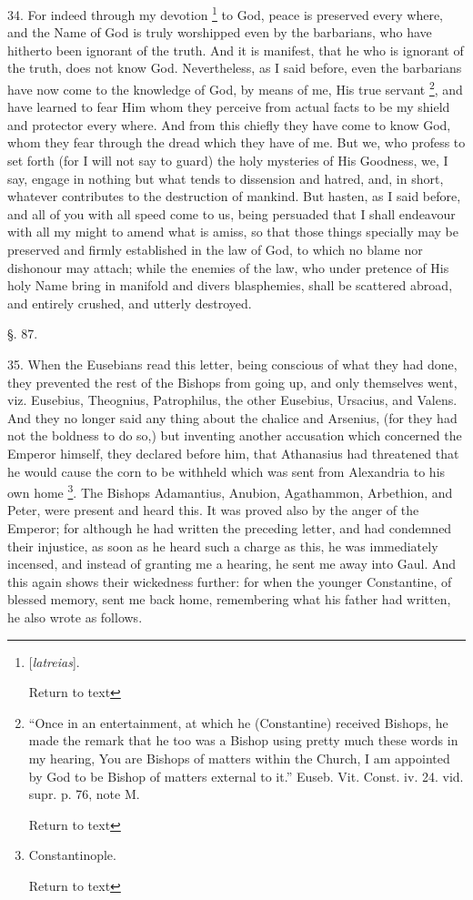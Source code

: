 34. For indeed through my devotion \footnote{[\emph{latreias}].

Return to text} to God, peace is preserved every where, and the Name of God is
truly worshipped even by the barbarians, who have hitherto been
ignorant of the truth. And it is manifest, that he who is ignorant of
the truth, does not know God. Nevertheless, as I said before, even the
barbarians have now come to the knowledge of God, by means of me, His
true servant \footnote{``Once in an entertainment, at which he (Constantine) received Bishops,
he made the remark that he too was a Bishop using pretty much these
words in my hearing, You are Bishops of matters within the Church, I
am appointed by God to be Bishop of matters external to it.'' Euseb.
Vit. Const. iv. 24. vid. supr. p. 76, note M.

Return to text}, and have
learned to fear Him whom they perceive from actual facts to be my
shield and protector every where. And from this chiefly they have come
to know God, whom they fear through the dread which they have of me.
But we, who profess to set forth (for I will not say to guard) the
holy mysteries of His Goodness, we, I say, engage in nothing but what
tends to dissension and hatred, and, in short, whatever contributes to
the destruction of mankind. But hasten, as I said before, and all of
you with all speed come to us, being persuaded that I shall endeavour
with all my might to amend what is amiss, so that those things
specially may be preserved and firmly established in the law of God,
to which no blame nor dishonour may attach; while the enemies of the
law, who under pretence of His holy Name bring in manifold and divers
blasphemies, shall be scattered abroad, and entirely crushed, and
utterly destroyed.

§. 87.

35. When the Eusebians read this letter, being
conscious of what they had done, they prevented the rest of the
Bishops from going up, and only themselves went, viz. Eusebius,
Theognius, Patrophilus, the other Eusebius, Ursacius, and Valens. And
they no longer said any thing about the chalice and Arsenius, (for
they had not the boldness to do so,) but inventing another accusation
which concerned the Emperor himself, they declared before him, that
Athanasius had threatened that he would cause the corn to be withheld
which was sent from Alexandria to his own home \footnote{Constantinople.

Return to text}. The Bishops Adamantius, Anubion, Agathammon, Arbethion, and
Peter, were present and heard this. It was proved also by the anger of
the Emperor; for although he had written the preceding letter, and had
condemned their injustice, as soon as he heard such a charge as this,
he was immediately incensed, and instead of granting me a hearing, he
sent me away into Gaul. And this again shows their wickedness further:
for when the younger Constantine, of blessed memory, sent me back
home, remembering what his father had written, he also wrote as
follows.

